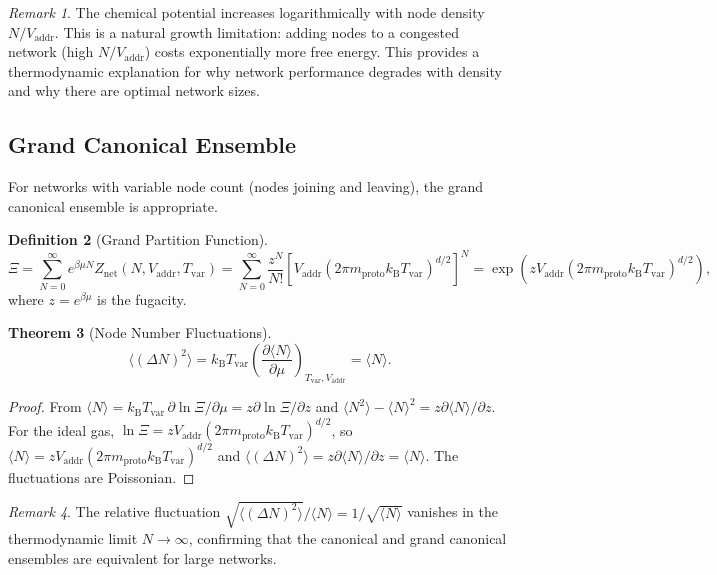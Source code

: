 \documentclass[11pt,twocolumn,a4paper]{article}
\newtheorem{theorem}{Theorem}[section]
\theoremstyle{definition}
\newtheorem{definition}[theorem]{Definition}
\theoremstyle{remark}
\newtheorem{remark}[theorem]{Remark}
\newcommand{\kB}{k_{\mathrm{B}}}
\newcommand{\Tvar}{T_{\mathrm{var}}}
\newcommand{\Vaddr}{V_{\mathrm{addr}}}
\newcommand{\mpr}{m_{\mathrm{proto}}}
\newcommand{\Znet}{Z_{\mathrm{net}}}
\newcommand{\avg}[1]{\langle #1 \rangle}
\newcommand{\pder}[2]{\frac{\partial #1}{\partial #2}}
\begin{document}
\begin{remark}
The chemical potential increases logarithmically with node density
$N/\Vaddr$.  This is a natural growth limitation: adding nodes to a
congested network (high $N/\Vaddr$) costs exponentially more free energy.
This provides a thermodynamic explanation for why network performance
degrades with density and why there are optimal network sizes.
\end{remark}

\subsection{Grand Canonical Ensemble}\label{sec:grand}

For networks with variable node count (nodes joining and leaving), the
grand canonical ensemble is appropriate.

\begin{definition}[Grand Partition Function]\label{def:grand}
\begin{equation}\label{eq:grand}
  \Xi = \sum_{N=0}^{\infty}e^{\beta\mu N}\Znet(N,\Vaddr,\Tvar)
  = \sum_{N=0}^{\infty}\frac{z^N}{N!}
  \left[\Vaddr(2\pi\mpr\kB\Tvar)^{d/2}\right]^N
  = \exp\!\left(z\Vaddr(2\pi\mpr\kB\Tvar)^{d/2}\right),
\end{equation}
where $z=e^{\beta\mu}$ is the fugacity.
\end{definition}

\begin{theorem}[Node Number Fluctuations]\label{thm:fluctuations}
\begin{equation}\label{eq:fluctuations}
  \avg{(\Delta N)^2} = \kB\Tvar\left(\pder{\avg{N}}{\mu}\right)_{\Tvar,\Vaddr}
  = \avg{N}.
\end{equation}
\end{theorem}

\begin{proof}
From $\avg{N}=\kB\Tvar\,\partial\ln\Xi/\partial\mu = z\partial\ln\Xi/\partial z$
and $\avg{N^2}-\avg{N}^2 = z\partial\avg{N}/\partial z$.  For the ideal gas,
$\ln\Xi=z\Vaddr(2\pi\mpr\kB\Tvar)^{d/2}$, so $\avg{N}=z\Vaddr(2\pi\mpr\kB\Tvar)^{d/2}$
and $\avg{(\Delta N)^2}=z\partial\avg{N}/\partial z=\avg{N}$.  The
fluctuations are Poissonian.
\end{proof}

\begin{remark}
The relative fluctuation $\sqrt{\avg{(\Delta N)^2}}/\avg{N}=1/\sqrt{\avg{N}}$
vanishes in the thermodynamic limit $N\to\infty$, confirming that the
canonical and grand canonical ensembles are equivalent for large networks.
\end{remark}
\end{document}
